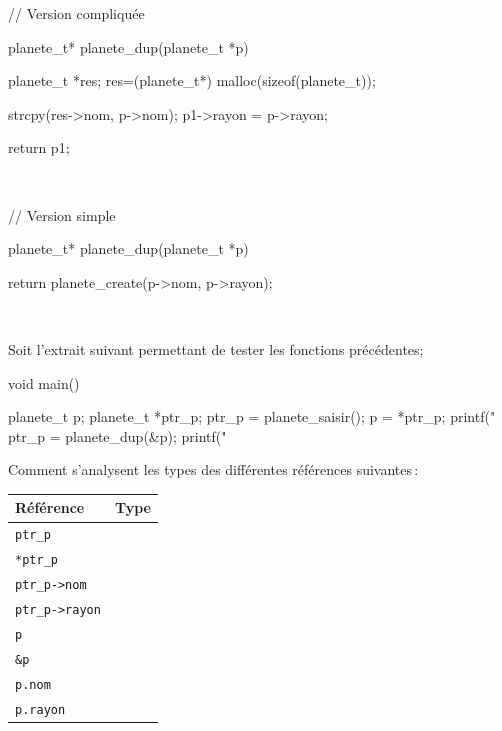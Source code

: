 \documentclass[10pt]{article}\usepackage[nu,correction]{esial}
\begin{document}
\begin{Reponse}
  \noindent
  \begin{boxedverbatim} 
// Version compliquée

planete_t* planete_dup(planete_t *p){

  planete_t *res;
  res=(planete_t*)
      malloc(sizeof(planete_t));
  
  strcpy(res->nom, p->nom);
  p1->rayon = p->rayon;
  
  return p1;
} \end{boxedverbatim}
~~~
  \begin{boxedverbatim} 
// Version simple

planete_t* planete_dup(planete_t *p){

  return planete_create(p->nom, 
                        p->rayon);
} 






\end{boxedverbatim}
~
\end{Reponse}

\Question  Soit l'extrait suivant permettant de tester les fonctions
précédentes;


\medskip


\begin{boxedverbatim}
void main() {

  planete_t p;
  planete_t *ptr_p;
  ptr_p = planete_saisir();
  p = *ptr_p;
  printf("%
  ptr_p = planete_dup(&p);
  printf("%
}
\end{boxedverbatim}


\bigskip Comment s'analysent les types des différentes références
suivantes\,:

\bigskip

\begin{tabular}{|p{.2\linewidth}|p{.3\linewidth}|}
  \hline
  Référence          &   Type  \\\hline
  \verb+ptr_p+       &         \\\hline                  
  \verb+*ptr_p+      &         \\\hline            
  \verb+ptr_p->nom+  &         \\\hline
  \verb+ptr_p->rayon+&         \\\hline
  \verb+p+           &         \\\hline
  \verb+&p+          &         \\\hline
  \verb+p.nom+       &         \\\hline
  \verb+p.rayon+     &         \\\hline
\end{tabular}
\end{document}
